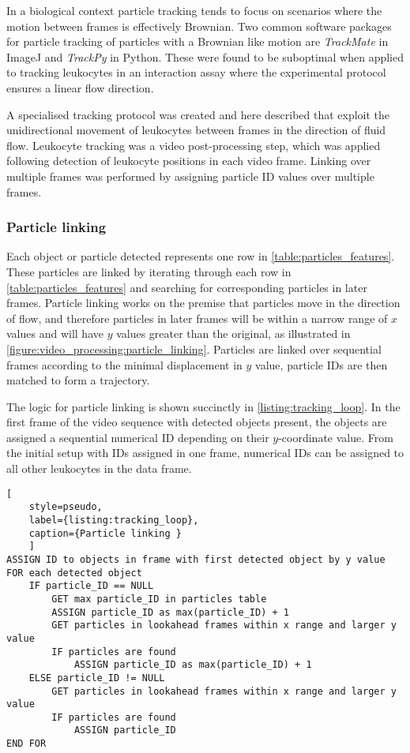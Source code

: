 In a biological context particle tracking tends to focus on scenarios where the motion between frames is effectively Brownian. Two common software packages for particle tracking of particles with a Brownian like motion are \emph{TrackMate} in ImageJ and \emph{TrackPy} in Python. These were found to be suboptimal when applied to tracking leukocytes in an interaction assay where the experimental protocol ensures a linear flow direction.

A specialised tracking protocol was created and here described that exploit the unidirectional movement of leukocytes between frames in the direction of fluid flow. Leukocyte tracking was a video post-processing step, which was applied following detection of leukocyte positions in each video frame. Linking over multiple frames was performed by assigning particle ID values over multiple frames.

\subsubsection{Particle linking}
Each object or particle detected represents one row in \autoref{table:particles_features}. These particles are linked by iterating through each row in \autoref{table:particles_features} and searching for corresponding particles in later frames. Particle linking works on the premise that particles move in the direction of flow, and therefore particles in later frames will be within a narrow range of $x$ values and will have $y$ values greater than the original, as illustrated in \autoref{figure:video_processing:particle_linking}. Particles are linked over sequential frames according to the minimal displacement in $y$ value, particle IDs are then matched to form a trajectory.

The logic for particle linking is shown succinctly in \autoref{listing:tracking_loop}. In the first frame of the video sequence with detected objects present, the objects are assigned a sequential numerical ID depending on their $y$-coordinate value. From the initial setup with IDs assigned in one frame, numerical IDs can be assigned to all other leukocytes in the data frame.

\begin{lstlisting}[
	style=pseudo,
	label={listing:tracking_loop},
	caption={Particle linking }
	]
ASSIGN ID to objects in frame with first detected object by y value
FOR each detected object
	IF particle_ID == NULL
		GET max particle_ID in particles table
		ASSIGN particle_ID as max(particle_ID) + 1
		GET particles in lookahead frames within x range and larger y value
		IF particles are found
			ASSIGN particle_ID as max(particle_ID) + 1
	ELSE particle_ID != NULL
		GET particles in lookahead frames within x range and larger y value
		IF particles are found
			ASSIGN particle_ID
END FOR
\end{lstlisting}

